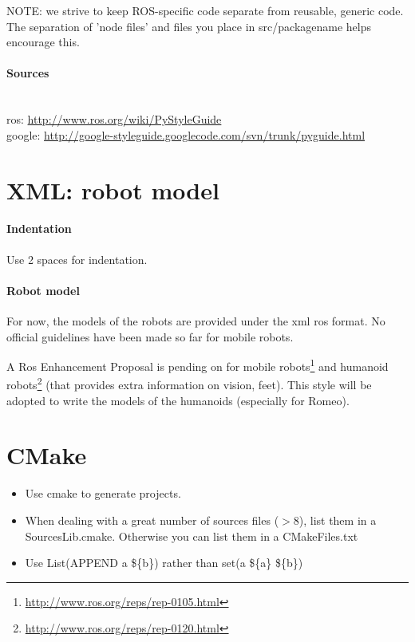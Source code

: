 NOTE: we strive to keep ROS-specific code separate from reusable, generic code. The separation of 'node files' and files you place in src/packagename helps encourage this. 


\paragraph{Sources}~\\
ros: \url{http://www.ros.org/wiki/PyStyleGuide}\\
google: \url{http://google-styleguide.googlecode.com/svn/trunk/pyguide.html}

\section{XML: robot model}
\paragraph{Indentation} Use 2 spaces for indentation.

\paragraph{Robot model}
For now, the models of the robots are provided under the xml ros format. %
No official guidelines have been made so far for mobile robots.

A Ros Enhancement Proposal is pending on for mobile robots\footnote{\url{http://www.ros.org/reps/rep-0105.html}} 
and humanoid robots\footnote{\url{http://www.ros.org/reps/rep-0120.html}}
(that provides extra information on vision, feet).
This style will be adopted to write the models of the humanoids (especially for Romeo).


\section{CMake}
\begin{itemize}
\item Use cmake to generate projects.

\item When dealing with a great number of sources files ($>8$), list them in a SourcesLib.cmake.
Otherwise you can list them in a CMakeFiles.txt

\item Use List(APPEND a \$\{b\}) rather than set(a \$\{a\} \$\{b\})
\end{itemize}


